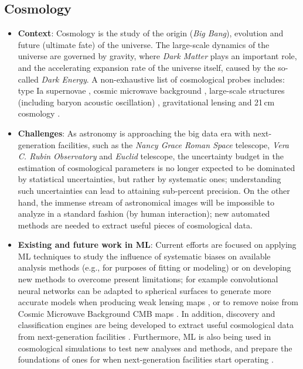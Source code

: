 \subsection{Cosmology}

\begin{itemize}
    \item \textbf{Context}: Cosmology is the study of the origin (\textit{Big Bang}), evolution and future (ultimate fate) of the universe. The large-scale dynamics of the universe are governed by gravity, where \textit{Dark Matter} plays an important role, and the accelerating expansion rate of the universe itself, caused by the so-called \textit{Dark Energy}. A non-exhaustive list of cosmological probes includes: type Ia supernovae \citep[][]{Riess_1998, Perlmutter_1999, Betoule_2014, Scolnic_2018, Abbott_2019}, cosmic microwave background \citep[][]{Fixsen_1996, Spergel_2003, Komatsu_2011, PC_2016, PC_2020}, large-scale structures (including baryon acoustic oscillation) \citep[][]{Eisenstein_2005, Percival_2010, Delubac_2015, Abbott_2019b}, gravitational lensing \citep[][]{Bacon_2000, Bacon_2003, Collett_2014, Suyu_2017, Heymans_2020} and 21\,cm cosmology \citep[][]{McQuinn_2007, Pritchard_2012, Maartens_2015, Beardsley_2016}.
    
    \item \textbf{Challenges}: As astronomy is approaching the big data era with next-generation facilities, such as the \textit{Nancy Grace Roman Space} telescope, \textit{Vera C. Rubin Observatory} and \textit{Euclid} telescope, the uncertainty budget in the estimation of cosmological parameters is no longer expected to be dominated by statistical uncertainties, but rather by systematic ones; understanding such uncertainties can lead to attaining sub-percent precision. On the other hand, the immense stream of astronomical images will be impossible to analyze in a standard fashion (by human interaction); new automated methods are needed to extract useful pieces of cosmological data.
    
    \item \textbf{Existing and future work in ML}: Current efforts are focused on applying ML techniques to study the influence of systematic biases on available analysis methods (e.g., for purposes of fitting or modeling) or on developing new methods to overcome present limitations; for example convolutional neural networks can be adapted to spherical surfaces to generate more accurate models when producing weak lensing maps \cite{Perraudin_2019}, or to remove noise from Cosmic Microwave Background CMB maps \cite{Petroff_2020}. In addition, discovery and classification engines are being developed to extract useful cosmological data from next-generation facilities \citep[][]{Narayan_2018, Mahabal_2019, Forster_2020, Moller_2020}. Furthermore, ML is also being used in cosmological simulations to test new analyses and methods, and prepare the foundations of ones for when next-generation facilities start operating \citep{Kamdar16, Rodriguez18, Villaescusa-Navarro20}.
    
\end{itemize}

